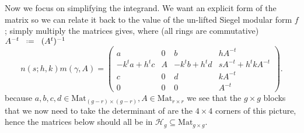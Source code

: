 Now we focus on simplifying the integrand. We want an explicit form of the matrix so we can relate it back to the value of the un-lifted Siegel modular form \(f\); simply multiply the matrices gives, where (all rings are commutative) \(A^{-t} \defeq (A^t)\inv\)
\[
n(s; h, k) m(\gamma, A) =
\begin{pmatrix}
	a & 0 & b & h A^{-t}\\
	-k^t a + h^t c & A & -k^t b + h^t d & s A^{-t} + h^t k A^{-t}\\
	c & 0 & d & k A^{-t}\\
	0 & 0 & 0 & A^{-t}
\end{pmatrix}.
\]
because \(a,b,c,d \in \mathrm{Mat}_{(g-r)\times (g-r)}, A \in \mathrm{Mat}_{r\times r}\) we see that the \(g\times g\) blocks that we now need to take the determinant of are the \(4\times 4\) corners of this picture, hence the matrices below should all be in \(\mathcal{H}_g\subseteq \mathrm{Mat}_{g\times g}\).

